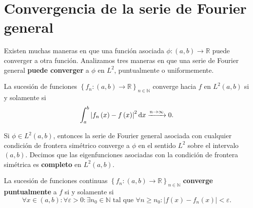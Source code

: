 \section{Convergencia de la serie de Fourier general}

Existen muchas maneras en que una función asociada
$\phi\colon\left(a,b\right)\to\mathbb{R}$ puede converger a otra
función.
Analizamos tres maneras en que una serie de Fourier general
\textbf{puede converger} a $\phi$ en $L^{2}$, puntualmente o
uniformemente.

\begin{definition}
    La sucesión de funciones
    \begin{math}
        \left\{
        f_{n}\colon\left(a,b\right)\to\mathbb{R}
        \right\}_{n\in\mathbb{N}}
    \end{math}
    converge hacia $f$ en $L^{2}\left(a,b\right)$ si y solamente si
    \begin{equation*}
        \int_{a}^{b}
        {\left|
        f_{n}\left(x\right)-
        f\left(x\right)
        \right|}^{2}
        \dl x
        \xrightarrow{n\to\infty}
        0.
    \end{equation*}
\end{definition}

\begin{theorem}
    Si $\phi\in L^{2}\left(a,b\right)$, entonces la serie de Fourier
    general asociada con cualquier condición de frontera simétrico
    converge a $\phi$ en el sentido $L^{2}$ sobre el intervalo
    $\left(a,b\right)$.
    Decimos que las eigenfunciones asociadas con la condición de
    frontera simétrica es \textbf{completo} en
    $L^{2}\left(a,b\right)$.
\end{theorem}

\begin{definition}
    La sucesión de funciones continuas
    \begin{math}
        \left\{
        f_{n}\colon\left(a,b\right)\to\mathbb{R}
        \right\}_{n\in\mathbb{N}}
    \end{math}
    \textbf{converge puntualmente} a $f$ si y solamente si
    \begin{equation*}
        \forall x\in\left(a,b\right):
        \forall\varepsilon>0:
        \exists n_{0}\in\mathbb{N}
        \text{ tal que }
        \forall n\geq n_{0}:
        \left|
        f\left(x\right)-
        f_{n}\left(x\right)
        \right|<
        \varepsilon.
    \end{equation*}
\end{definition}

